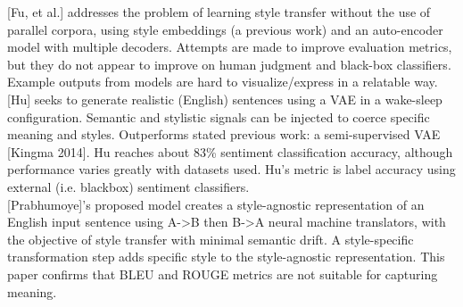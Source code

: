 \documentclass[letterpaper, 10 pt, conference]{ieeeconf}  %
\begin{document}
[Fu, et al.] addresses the problem of learning style transfer without the use of parallel corpora, using style embeddings (a previous work) and an auto-encoder model with multiple decoders. Attempts are made to improve evaluation metrics, but they do not appear to improve on human judgment and black-box classifiers. Example outputs from models are hard to visualize/express in a relatable way.
\\ 

[Hu] seeks to generate realistic (English) sentences using a VAE in a wake-sleep configuration. Semantic and stylistic signals can be injected to coerce specific meaning and styles.
Outperforms stated previous work: a semi-supervised VAE [Kingma 2014]. Hu reaches about 83\% sentiment classification accuracy, although performance varies greatly with datasets used. Hu's metric is label accuracy using external (i.e. blackbox) sentiment classifiers.
\\ 

[Prabhumoye]'s proposed model creates a style-agnostic representation of an English input sentence using A->B then B->A neural machine translators, with the objective of style transfer with minimal semantic drift. A style-specific transformation step adds specific style to the style-agnostic representation. This paper confirms that BLEU and ROUGE metrics are not suitable for capturing meaning.
\end{document}
